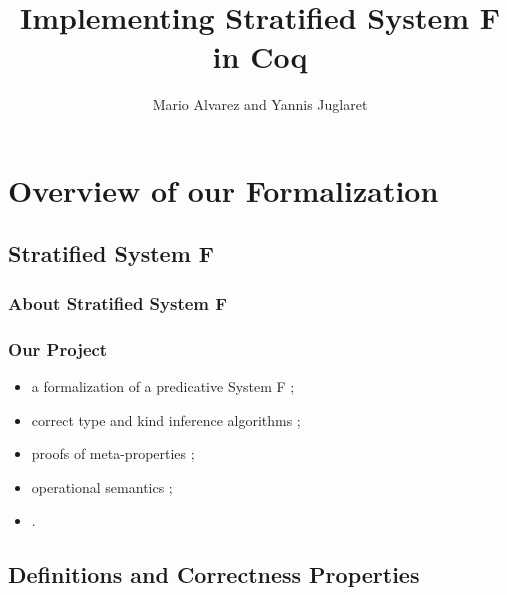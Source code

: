 \documentclass{beamer}
\title{Implementing Stratified System F in Coq}
\author{Mario Alvarez and Yannis Juglaret}
\date{\displaydate{date}}
\begin{document}
\begin{frame}
\titlepage
\end{frame}




\section{Overview of our Formalization}

\subsection{Stratified System F}

\begin{frame}
  \frametitle{About Stratified System F}

\end{frame}

\begin{frame}
  \frametitle{Our Project}

  \begin{itemize}
    \item a formalization of a predicative System F ;
    \item correct type and kind inference algorithms ;
    \item proofs of meta-properties ;
    \item operational semantics ;
    \item . %
  \end{itemize}

\end{frame}

\subsection{Definitions and Correctness Properties}
\end{document}
